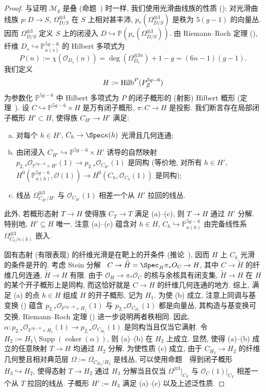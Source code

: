 \begin{proof}
与证明 $\mathcal M_g$ 是叠 (命题~) 时一样, 我们使用光滑曲线族的性质 (): 对光滑曲线族 $p:D\to S$, $\Omega_{D/S}^{\otimes3}$ 在 $S$ 上相对甚丰沛, $p_*(\Omega_{D/S}^{\otimes3})$ 是秩为 $5(g-1)$ 的向量丛. 因而 $\Omega_{D/S}^{\otimes3}$ 定义 $S$ 上的闭浸入 $D\hookrightarrow\mathbb P(p_*(\Omega_{D/S}^{\otimes3}))$.
由 Riemann--Roch 定理 (), 纤维 $D_s\hookrightarrow\mathbb P^{5g-6}_{\kappa(s)}$ 的 Hilbert 多项式为
\[
P(n):=\chi(\mathcal O_{D_s}(n))=\deg(\Omega_{D_s}^{\otimes3n})+1-g=(6n-1)(g-1).
\]
我们定义
\[
H:=\operatorname{Hilb}^P(P^{5g-6}_{Z})
\]
为参数化 $\mathbb P^{5g-6}$ 中 Hilbert 多项式为 $P$ 的闭子概形的 (射影) Hilbert 概形 (定理~). 设 $C\hookrightarrow\mathbb P^{5g-6}\times H$ 是万有闭子概形, $\pi:C\to H$ 是投影.
我们断言存在局部闭子概形 $H'\subset H$, 使得族 $C_{H'}\to H'$ 满足:
\begin{enumerate}[(a)]
\item 对每个 $h\in H'$, $C_h\to\Spec\kappa(h)$ 光滑且几何连通;
\item 由闭浸入 $C_{H'}\hookrightarrow\mathbb P^{5g-6}\times H'$ 诱导的自然映射
$p_{2,*}\mathcal O_{\mathbb P^{5g-6}\times H'}(1)\to p_{2,*}\mathcal O_{C_{H'}}(1)$
是同构 (等价地, 对所有 $h\in H'$, $H^0(\mathbb P^{5g-6}_{\kappa(h)},\mathcal O(1))\to H^0(C_h,\mathcal O_{C_h}(1))$ 是同构);
\item 线丛 $\Omega_{C_{H'}/H'}^{\otimes3}$ 与 $\mathcal O_{C_{H'}}(1)$ 相差一个从 $H'$ 拉回的线丛.
\end{enumerate}
此外, 若概形态射 $T\to H$ 使得族 $C_T\to T$ 满足 (a)--(c), 则 $T\to H$ 通过 $H'$ 分解. 特别地, $H'\subseteq H$ 唯一. 注意 (a)--(c) 蕴含对 $h\in H$, $C_h\hookrightarrow\mathbb P^{5g-6}_{\kappa(h)}$ 由完备线性系 $\Omega_{C_h/\kappa(h)}^{\otimes3}$ 嵌入.

固有态射 (有限表现) 的纤维光滑是在靶上的开条件 (推论~), 因而 $H$ 上 $C_h$ 光滑的条件是开的.
考虑 Stein 分解~\cite[推论 $11.5$]{Har77}
$C\to\widetilde H=\Spec_H\pi_*\mathcal O_C\to H$, 其中 $C\to\widetilde H$ 的纤维几何连通, $\widetilde H\to H$ 有限. 由于 $\mathcal O_H\to\pi_*\mathcal O_C$ 的核与余核具有闭支集, $\widetilde H\to H$ 在 $H$ 的某个开子概形上是同构, 而这恰好就是 $C\to H$ 的纤维几何连通的地方.
综上, 满足 (a) 的点 $h\in H$ 组成 $H$ 的开子概形, 记为 $H_1$.
为使 (b) 成立, 注意上同调与基变换 () 蕴含 $p_{2,*}\mathcal O_{\mathbb P^{5g-6}\times H_1}(1)$ 与 $p_{2,*}\mathcal O_{C_{H_1}}(1)$ 都是向量丛, 其构造与基变换可交换. Riemann--Roch 定理 () 进一步说明两者秩相同.
因此, $\alpha:p_{2,*}\mathcal O_{\mathbb P^{5g-6}\times H_1}(1)\to p_{2,*}\mathcal O_{C_{H_1}}(1)$ 是同构当且仅当它满射. 令 $H_2:=H_1\setminus\operatorname{Supp}(\operatorname{coker}(\alpha))$, 则 (a)--(b) 在 $H_2$ 上成立.
显然, 使得 (a)--(b) 成立的任意映射 $T\to H$ 均通过 $H_2$ 分解.
为使性质 (c) 成立, 由于 $C_{H_2}\to H_2$ 的纤维几何整且相对典范层 $\Omega:=\Omega_{C_{H_2}/H_2}$ 是线丛, 可以使用命题~~得到闭子概形 $H_3\hookrightarrow H_2$, 使得态射 $T\to H_2$ 通过 $H_3$ 分解当且仅当 $\Omega^{\otimes3}|_{C_T}$ 与 $\mathcal O_C(1)|_{C_T}$ 相差一个从 $T$ 拉回的线丛.
子概形 $H':=H_3$ 满足 (a)--(c) 以及上述泛性质.


\end{proof}
